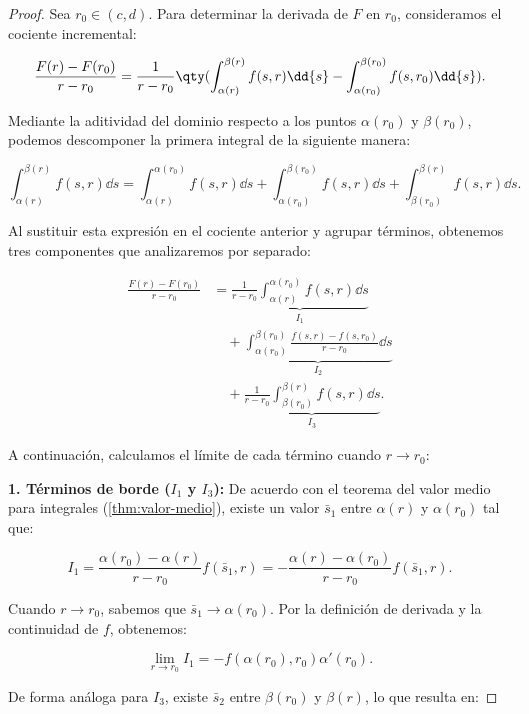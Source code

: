 \begin{proof}

  Sea \( r_0 \in (c,d) \). Para determinar la derivada de \( F \) en \( r_0 \), consideramos el cociente incremental:

  \[ \frac{F(r) - F(r_0)}{r-r_0} = \frac{1}{r-r_0} \qty(\int_{\alpha(r)}^{\beta(r)} f(s,r) \dd{s} - \int_{\alpha(r_0)}^{\beta(r_0)} f(s,r_0) \dd{s} ). \]

  Mediante la aditividad del dominio respecto a los puntos \( \alpha(r_0) \) y \( \beta(r_0) \), podemos descomponer la primera integral de la siguiente manera:
  
  \[ \int_{\alpha(r)}^{\beta(r)} f(s,r) \dd{s} = \int_{\alpha(r)}^{\alpha(r_0)}f(s,r) \dd{s} + \int_{\alpha(r_0)}^{\beta(r_0)} f(s,r)\dd{s} + \int_{\beta(r_0)}^{\beta(r)} f(s,r)\dd{s}. \]

  Al sustituir esta expresión en el cociente anterior y agrupar términos, obtenemos tres componentes que analizaremos por separado:

  \[
  \begin{aligned}
  \frac{F(r) - F(r_0)}{r - r_0} &= \underbrace{\frac{1}{r - r_0} \int_{\alpha(r)}^{\alpha(r_0)} f(s,r) \dd{s}}_{I_1} \\
  &\quad + \underbrace{\int_{\alpha(r_0)}^{\beta(r_0)} \frac{f(s,r) - f(s,r_0)}{r - r_0} \dd{s}}_{I_2} \\
  &\quad + \underbrace{\frac{1}{r - r_0} \int_{\beta(r_0)}^{\beta(r)} f(s,r) \dd{s}}_{I_3}.
  \end{aligned}
  \]

  A continuación, calculamos el límite de cada término cuando \( r \to r_0 \):

  \textbf{1. Términos de borde (\( I_1 \) y \( I_3 \)):} De acuerdo con el teorema del valor medio para integrales (\cref{thm:valor-medio}), existe un valor \( \bar{s}_1 \) entre \( \alpha(r) \) y \( \alpha(r_0) \) tal que:

  \[ I_1 = \frac{\alpha(r_0) - \alpha(r)}{r-r_0} f(\bar{s}_1,r) = - \frac{\alpha(r) - \alpha(r_0)}{r-r_0}f(\bar{s}_1,r). \]

  Cuando \( r \to r_0 \), sabemos que \( \bar{s}_1 \to \alpha(r_0) \). Por la definición de derivada y la continuidad de \( f \), obtenemos:

  \[ \lim_{r\to r_0} I_{1} = - f(\alpha(r_0), r_0) \alpha'(r_0). \]

  De forma análoga para \( I_3 \), existe \( \bar{s}_2 \) entre \( \beta(r_0) \) y \( \beta(r) \), lo que resulta en:


\end{proof}

